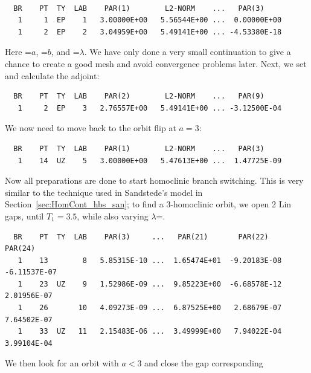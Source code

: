 \documentclass[12pt]{report}
\begin{document}
\begin{center}
\\
\end{center}
\begin{verbatim}
  BR    PT  TY  LAB    PAR(1)        L2-NORM    ...   PAR(3)     
   1     1  EP    1   3.00000E+00   5.56544E+00 ...  0.00000E+00
   1     2  EP    2   3.04959E+00   5.49141E+00 ... -4.53380E-18
\end{verbatim}
Here =$a$, =$b$, and
=$\lambda$. We have only done a
very small continuation to give \AUTO a chance to create a good mesh
and avoid convergence problems later.
Next, we set  and calculate the adjoint:
\begin{center}
\end{center}
\begin{verbatim}
  BR    PT  TY  LAB    PAR(2)        L2-NORM    ...   PAR(9)
   1     2  EP    3   2.76557E+00   5.49141E+00 ... -3.12500E-04
\end{verbatim}
We now need to move back to the orbit flip at $a=3$:
\begin{center}
\end{center}
\begin{verbatim}
  BR    PT  TY  LAB    PAR(1)        L2-NORM    ...   PAR(3)     
   1    14  UZ    5   3.00000E+00   5.47613E+00 ...  1.47725E-09
\end{verbatim}
Now all preparations are done to start homoclinic branch
switching. This is very similar to the technique used in 
Sandstede's model in Section~\ref{sec:HomCont_hbs_san}; 
to find a 3-homoclinic orbit, we open 2 Lin gaps,
until $T_1=3.5$, while also varying $\lambda$=.
\begin{center}
\end{center}
\begin{verbatim}
  BR    PT  TY  LAB    PAR(3)     ...   PAR(21)       PAR(22)       PAR(24)
   1    13        8   5.85315E-10 ...  1.65474E+01  -9.20183E-08  -6.11537E-07
   1    23  UZ    9   1.52986E-09 ...  9.85223E+00  -6.68578E-12   2.01956E-07
   1    26       10   4.09273E-09 ...  6.87525E+00   2.68679E-07   7.64502E-07
   1    33  UZ   11   2.15483E-06 ...  3.49999E+00   7.94022E-04   3.99104E-04
\end{verbatim}
We then look for an orbit with $a<3$ and close the gap corresponding 
\end{document}
